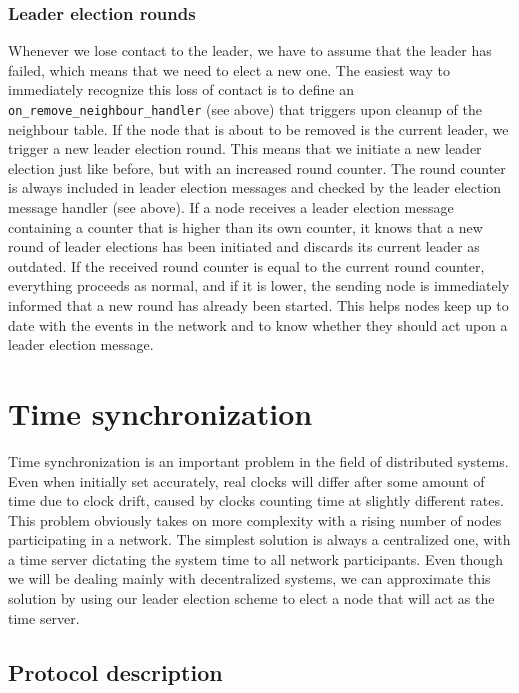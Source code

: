 \documentclass[11pt,
  a4paper,
  ngerman,
  BCOR=7mm
]{scrartcl}
\begin{document}
\subsubsection*{Leader election rounds}
\label{ssub:leader_election_rounds}
Whenever we lose contact to the leader, we have to assume that the
leader has failed, which means that we need to elect a new one. The
easiest way to immediately recognize this loss of contact is to define
an \lstinline!on_remove_neighbour_handler! (see above) that triggers
upon cleanup of the neighbour table. If the node that is about to be
removed is the current leader, we trigger a new leader election round.
This means that we initiate a new leader election just like before, but
with an increased round counter. The round counter is always included in
leader election messages and checked by the leader election message
handler (see above). If a node receives a leader election message
containing a counter that is higher than its own counter, it knows that
a new round of leader elections has been initiated and discards its
current leader as outdated. If the received round counter is equal to
the current round counter, everything proceeds as normal, and if it is
lower, the sending node is immediately informed that a new round has
already been started. This helps nodes keep up to date with the events
in the network and to know whether they should act upon a leader
election message.

\section*{Time synchronization}
\label{sec:Time synchronization}
Time synchronization is an important problem in the field of distributed
systems. Even when initially set accurately, real clocks will differ
after some amount of time due to clock drift, caused by clocks counting
time at slightly different rates. This problem obviously takes on more
complexity with a rising number of nodes participating in a network. The
simplest solution is always a centralized one, with a time server
dictating the system time to all network participants. Even though we
will be dealing mainly with decentralized systems, we can approximate
this solution by using our leader election scheme to elect a node that
will act as the time server.

\newpage

\subsection*{Protocol description}
\label{sub:protocol_time_synch}
\end{document}
